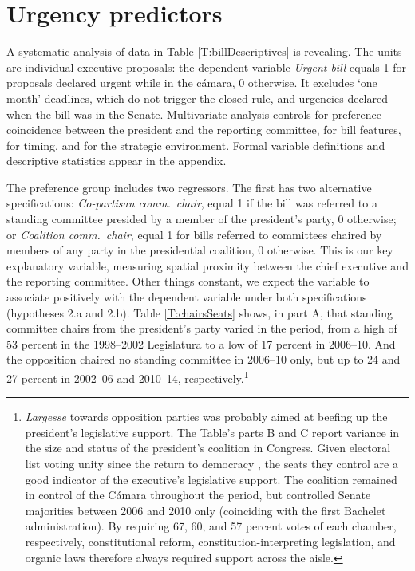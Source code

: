 \documentclass[letter,12pt]{article}
\newcommand{\emm}[1]{\todo[color=red!15, inline]{\textbf{Eric:} #1}}
\newcommand{\ges}[1]{\todo[color=blue!15, inline]{\textbf{Ges:} #1}}
\begin{document}

\section{Urgency predictors}

A systematic analysis of data in Table \ref{T:billDescriptives} is revealing. The units are individual executive proposals: the dependent variable \emph{Urgent bill} equals 1 for proposals declared urgent while in the cámara, 0 otherwise. It excludes `one month' deadlines, which do not trigger the closed rule, and urgencies declared when the bill was in the Senate. Multivariate analysis controls for preference coincidence between the president and the reporting committee, for bill features, for timing, and for the strategic environment. Formal variable definitions and descriptive statistics appear in the appendix.

The preference group includes two regressors. The first has two alternative specifications: \emph{Co-partisan comm.\ chair}, equal 1 if the bill was referred to a standing committee presided by a member of the president's party, 0 otherwise; or \emph{Coalition comm.\ chair}, equal 1 for bills referred to committees chaired by members of any party in the presidential coalition, 0 otherwise. This is our key explanatory variable, measuring spatial proximity between the chief executive and the reporting committee. Other things constant, we expect the variable to associate positively with the dependent variable under both specifications (hypotheses 2.a and 2.b). Table \ref{T:chairsSeats} shows, in part A, that standing committee chairs from the president's party varied in the period, from a high of 53 percent in the 1998--2002 Legislatura to a low of 17 percent in 2006--10. And the opposition chaired no standing committee in 2006--10 only, but up to 24 and 27 percent in 2002--06 and 2010--14, respectively.\footnote{\emph{Largesse} towards opposition parties was probably aimed at beefing up the president's legislative support. The Table's parts B and C report variance in the size and status of the president's coalition in Congress. Given electoral list voting unity since the return to democracy \citep{carey.2002,aleman.saiegh.coalUnityChile.2007}, the seats they control are a good indicator of the executive's legislative support. The coalition remained in control of the Cámara throughout the period, but controlled Senate majorities between 2006 and 2010 only (coinciding with the first Bachelet administration). By requiring 67, 60, and 57 percent votes of each chamber, respectively, constitutional reform, constitution-interpreting legislation, and organic laws therefore always required support across the aisle.} 
\end{document}
